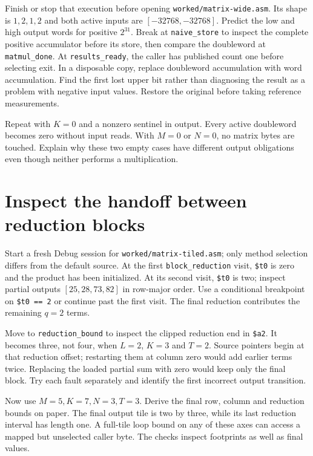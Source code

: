 Finish or stop that execution before opening \texttt{worked/matrix-wide.asm}.
Its shape is $1,2,1,2$ and both active inputs are $[-32768,-32768]$. Predict the
low and high output words for positive $2^{31}$. Break at \texttt{naive\_store}
to inspect the complete positive accumulator before its store, then compare the
doubleword at \texttt{matmul\_done}. At \texttt{results\_ready}, the caller
has published count one before selecting exit. In a disposable copy, replace doubleword accumulation with word accumulation. Find the
first lost upper bit rather than diagnosing the result as a problem with negative
input values. Restore the original before taking reference measurements.



Repeat with $K=0$ and a nonzero sentinel in output. Every active doubleword becomes
zero without input reads. With $M=0$ or $N=0$, no matrix bytes are touched. Explain
why these two empty cases have different output obligations even though neither
performs a multiplication.

\section{Inspect the handoff between reduction blocks}

Start a fresh Debug session for \texttt{worked/matrix-tiled.asm}; only method
selection differs from the default source. At the first \texttt{block\_reduction}
visit, \texttt{\$t0} is zero and the product has been initialized. At its second
visit, \texttt{\$t0} is two; inspect partial outputs $[25,28,73,82]$ in row-major
order. Use a conditional breakpoint on \texttt{\$t0 == 2} or continue past the
first visit. The final reduction contributes the remaining $q=2$ terms.

Move to \texttt{reduction\_bound} to inspect the clipped reduction end in
\texttt{\$a2}. It becomes three, not four,
when $L=2$, $K=3$ and $T=2$. Source pointers begin at that reduction offset;
restarting them at column zero would add earlier terms twice. Replacing the loaded
partial sum with zero would keep only the final block. Try each fault separately
and identify the first incorrect output transition.

Now use $M=5,K=7,N=3,T=3$. Derive the final row, column and reduction bounds on
paper. The final output tile is two by three, while its last reduction interval
has length one. A full-tile loop bound on any of these axes can access a mapped
but unselected caller byte. The checks inspect footprints as well as final values.

